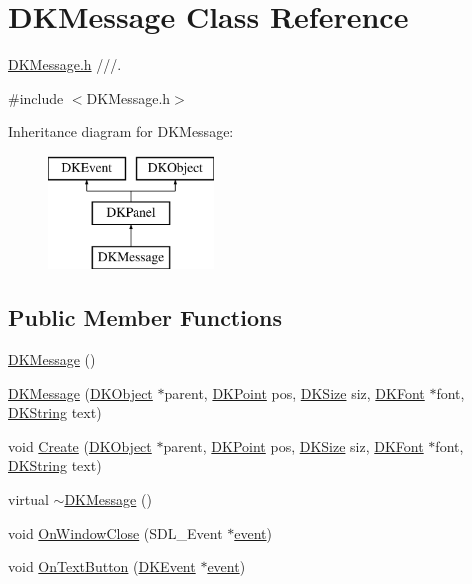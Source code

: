 \hypertarget{class_d_k_message}{\section{D\-K\-Message Class Reference}
\label{class_d_k_message}
}


\hyperlink{_d_k_message_8h}{D\-K\-Message.\-h} ///.  




{\ttfamily \#include $<$D\-K\-Message.\-h$>$}

Inheritance diagram for D\-K\-Message\-:\begin{figure}[H]
\begin{center}
\leavevmode
\includegraphics[height=3.000000cm]{class_d_k_message}
\end{center}
\end{figure}
\subsection*{Public Member Functions}
\begin{DoxyCompactItemize}
\item 
\hyperlink{class_d_k_message_a53dcb35cd0477f35ceeaac56bffde9d8}{D\-K\-Message} ()
\item 
\hyperlink{class_d_k_message_a646a30589b89a9cd22789ebada421a3a}{D\-K\-Message} (\hyperlink{class_d_k_object}{D\-K\-Object} $\ast$parent, \hyperlink{_d_k_axis_8h_a0ca1f005fbb936f8e7a7f2433591f418}{D\-K\-Point} pos, \hyperlink{_d_k_axis_8h_aaa25a8c7cbf504fffdb8a4208ff7a731}{D\-K\-Size} siz, \hyperlink{class_d_k_font}{D\-K\-Font} $\ast$font, \hyperlink{_d_k_string_8h_ac168e8555ceba18e1a2919b21976bc84}{D\-K\-String} text)
\item 
void \hyperlink{class_d_k_message_a76545dcbcdb2a4eaafa593441b786670}{Create} (\hyperlink{class_d_k_object}{D\-K\-Object} $\ast$parent, \hyperlink{_d_k_axis_8h_a0ca1f005fbb936f8e7a7f2433591f418}{D\-K\-Point} pos, \hyperlink{_d_k_axis_8h_aaa25a8c7cbf504fffdb8a4208ff7a731}{D\-K\-Size} siz, \hyperlink{class_d_k_font}{D\-K\-Font} $\ast$font, \hyperlink{_d_k_string_8h_ac168e8555ceba18e1a2919b21976bc84}{D\-K\-String} text)
\item 
virtual \hyperlink{class_d_k_message_ad9f4643618d22a2b7fbad3c3df4fa218}{$\sim$\-D\-K\-Message} ()
\item 
void \hyperlink{class_d_k_message_a65e5604ecac8636c0ff7d1f6762b4442}{On\-Window\-Close} (S\-D\-L\-\_\-\-Event $\ast$\hyperlink{class_d_k_event_a3deebb932ed734363c4ece87971bc45f}{event})
\item 
void \hyperlink{class_d_k_message_a5becce05290ea247d3ef1e2bb3e69914}{On\-Text\-Button} (\hyperlink{class_d_k_event}{D\-K\-Event} $\ast$\hyperlink{class_d_k_event_a3deebb932ed734363c4ece87971bc45f}{event})
\end{DoxyCompactItemize}
